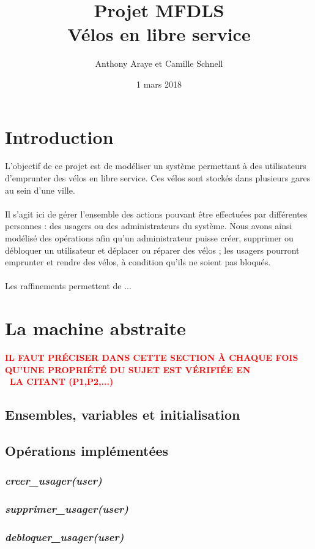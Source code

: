 \documentclass[12pt]{article}
\title{Projet MFDLS \\ Vélos en libre service}
\author{Anthony Araye et Camille Schnell}
\date{1 mars 2018}
\begin{document}
\maketitle
\newpage
\renewcommand{\contentsname}{Sommaire}
\tableofcontents
\newpage
\section{Introduction}
L'objectif de ce projet est de modéliser un système permettant à des utilisateurs d'emprunter des vélos en libre service. Ces vélos sont stockés dans plusieurs gares au sein d'une ville. \\ \\
Il s'agit ici de gérer l'ensemble des actions pouvant être effectuées par différentes personnes : des usagers ou des administrateurs du système. Nous avons ainsi modélisé des opérations afin qu'un administrateur puisse créer, supprimer ou débloquer un utilisateur et déplacer ou réparer des vélos ; les usagers pourront emprunter et rendre des vélos, à condition qu'ils ne soient pas bloqués. \\ \\
Les raffinements permettent de ...
\newpage
\section{La machine abstraite}
\textcolor{red}{\textbf{IL FAUT PRÉCISER DANS CETTE SECTION À CHAQUE FOIS QU'UNE PROPRIÉTÉ DU SUJET EST VÉRIFIÉE EN \\ LA CITANT (P1,P2,...)}}
\subsection{Ensembles, variables et initialisation}
\subsection{Opérations implémentées}
\subsubsection{\textit{creer\_usager(user)}}
\subsubsection{\textit{supprimer\_usager(user)}}
\subsubsection{\textit{debloquer\_usager(user)}}
\end{document}
